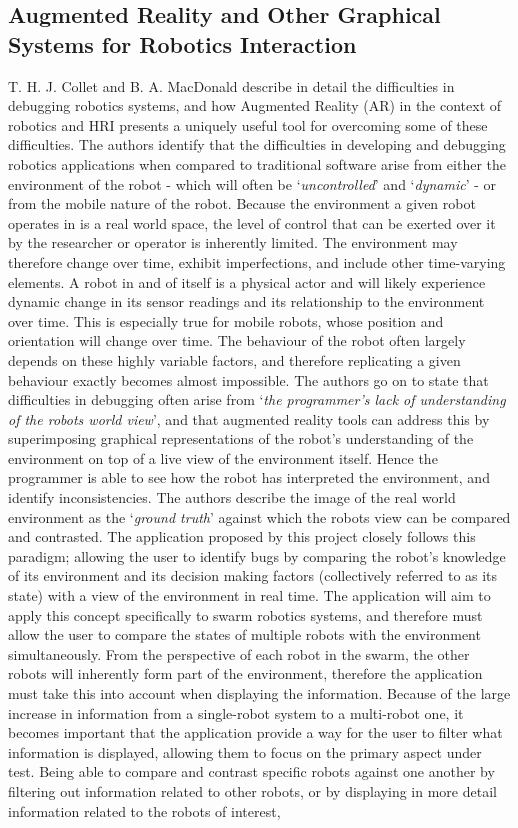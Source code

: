 \documentclass[titlepage,hidelinks,10pt]{article}
\begin{document}
\subsection{Augmented Reality and Other Graphical Systems for Robotics Interaction} \label{VRAndAR}
T. H. J. Collet and B. A. MacDonald describe in detail the difficulties in debugging robotics systems, and how Augmented Reality (AR) in the context of robotics and HRI presents a uniquely useful tool for overcoming some of these difficulties\cite{AugmentedRealityDebuggingSystem}. The authors identify that the difficulties in developing and debugging robotics applications when compared to traditional software arise from either the environment of the robot - which will often be `\textit{uncontrolled}' and `\textit{dynamic}' - or from the mobile nature of the robot. Because the environment a given robot operates in is a real world space, the level of control that can be exerted over it by the researcher or operator is inherently limited. The environment may therefore change over time, exhibit imperfections, and include other time-varying elements. A robot in and of itself is a physical actor and will likely experience dynamic change in its sensor readings and its relationship to the environment over time. This is especially true for mobile robots, whose position and orientation will change over time. The behaviour of the robot often largely depends on these highly variable factors, and therefore replicating a given behaviour exactly becomes almost impossible. The authors go on to state that difficulties in debugging often arise from `\textit{the programmer's lack of understanding of the robots world view}', and that augmented reality tools can address this by superimposing graphical representations of the robot's understanding of the environment on top of a live view of the environment itself. Hence the programmer is able to see how the robot has interpreted the environment, and identify inconsistencies. The authors describe the image of the real world environment as the `\textit{ground truth}' against which the robots view can be compared and contrasted. The application proposed by this project closely follows this paradigm; allowing the user to identify bugs by comparing the robot's knowledge of its environment and its decision making factors (collectively referred to as its state) with a view of the environment in real time. The application will aim to apply this concept specifically to swarm robotics systems, and therefore must allow the user to compare the states of multiple robots with the environment simultaneously. From the perspective of each robot in the swarm, the other robots will inherently form part of the environment, therefore the application must take this into account when displaying the information. Because of the large increase in information from a single-robot system to a multi-robot one, it becomes important that the application provide a way for the user to filter what information is displayed, allowing them to focus on the primary aspect under test. Being able to compare and contrast specific robots against one another by filtering out information related to other robots, or by displaying in more detail information related to the robots of interest, 
\end{document}
